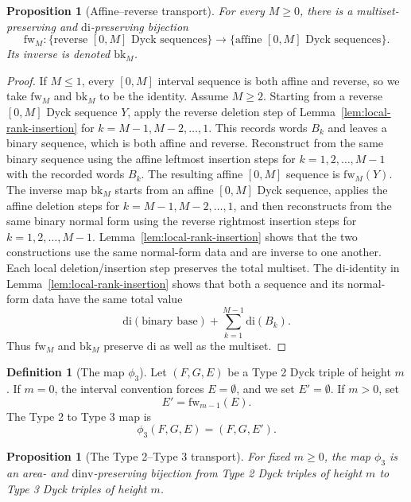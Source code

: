 \documentclass[11pt]{article}
\theoremstyle{plain}
\newtheorem{proposition}[theorem]{Proposition}
\theoremstyle{definition}
\newtheorem{definition}[theorem]{Definition}
\theoremstyle{remark}
\newcommand{\di}{\mathrm{di}}
\newcommand{\dinv}{\mathrm{dinv}}
\begin{document}
\begin{proposition}[Affine--reverse transport]
\label{prop:affine-reverse-transport}
For every \(M\ge 0\), there is a multiset-preserving and
\(\di\)-preserving bijection
\[
  \mathrm{fw}_M:
  \{\text{reverse }[0,M]\text{ Dyck sequences}\}
  \longrightarrow
  \{\text{affine }[0,M]\text{ Dyck sequences}\}.
\]
Its inverse is denoted \(\mathrm{bk}_M\).
\end{proposition}
\begin{proof}
If \(M\le 1\), every \([0,M]\) interval sequence is both affine and reverse,
so we take \(\mathrm{fw}_M\) and \(\mathrm{bk}_M\) to be the identity.  Assume
\(M\ge 2\).
Starting from a reverse \([0,M]\) Dyck sequence \(Y\), apply the reverse
deletion step of Lemma~\ref{lem:local-rank-insertion} for
\(k=M-1,M-2,\ldots,1\).  This records words \(B_k\) and leaves a binary
sequence, which is both affine and reverse.  Reconstruct from the same binary
sequence using the affine leftmost insertion steps for \(k=1,2,\ldots,M-1\)
with the recorded words \(B_k\).  The resulting affine \([0,M]\) sequence is
\(\mathrm{fw}_M(Y)\).
The inverse map \(\mathrm{bk}_M\) starts from an affine \([0,M]\) Dyck
sequence, applies the affine deletion steps for \(k=M-1,M-2,\ldots,1\), and
then reconstructs from the same binary normal form using the reverse rightmost
insertion steps for \(k=1,2,\ldots,M-1\).  Lemma~\ref{lem:local-rank-insertion}
shows that the two constructions use the same normal-form data and are inverse
to one another.
Each local deletion/insertion step preserves the total multiset.  The
\(\di\)-identity in Lemma~\ref{lem:local-rank-insertion} shows that both a
sequence and its normal-form data have the same total value
\[
  \di(\text{binary base})+
  \sum_{k=1}^{M-1}\di(B_k).
\]
Thus \(\mathrm{fw}_M\) and \(\mathrm{bk}_M\) preserve \(\di\) as well as the
multiset.
\end{proof}
\begin{definition}[The map \(\phi_3\)]
\label{def:phi3}
Let \((F,G,E)\) be a Type 2 Dyck triple of height \(m\).  If \(m=0\), the
interval convention forces \(E=\emptyset\), and we set \(E'=\emptyset\).  If
\(m>0\), set
\[
  E'=\mathrm{fw}_{m-1}(E).
\]
The Type 2 to Type 3 map is
\[
  \phi_3(F,G,E)=(F,G,E').
\]
\end{definition}
\begin{proposition}[The Type 2--Type 3 transport]
\label{prop:phi3-bijection}
For fixed \(m\ge 0\), the map \(\phi_3\) is an area- and
\(\dinv\)-preserving bijection from Type 2 Dyck triples of height \(m\) to
Type 3 Dyck triples of height \(m\).
\end{proposition}
\end{document}
